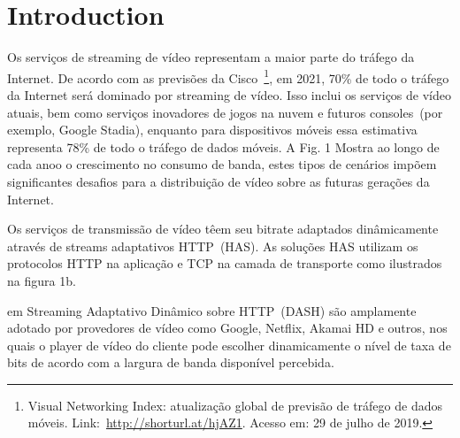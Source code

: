 \section{Introduction}
\label{ch:introduction}



Os serviços de streaming de vídeo representam a maior parte do tráfego da Internet. De acordo com as previsões da Cisco~\footnote{Visual Networking Index: atualização global de previsão de tráfego de dados móveis. Link:~\url{http://shorturl.at/hjAZ1}. Acesso em: 29 de julho de 2019.}, em 2021, 70\% de todo o tráfego da Internet será dominado por streaming de vídeo. Isso inclui os serviços de vídeo atuais, bem como serviços inovadores de jogos na nuvem e futuros consoles~(por exemplo, Google Stadia), enquanto para dispositivos móveis essa estimativa representa 78\% de todo o tráfego de dados móveis. A Fig. 1 Mostra ao longo de cada anoo o crescimento no consumo de banda, estes tipos de cenários impõem significantes desafios para a distribuição de vídeo sobre as futuras gerações da Internet.


Os serviços de transmissão de vídeo têem seu bitrate adaptados dinâmicamente através de streams adaptativos HTTP~(HAS). As soluções HAS utilizam os protocolos HTTP na aplicação e TCP na camada de transporte como ilustrados na figura 1b. 

em Streaming Adaptativo Dinâmico sobre HTTP~(DASH) são amplamente adotado por provedores de vídeo como Google, Netflix, Akamai HD e outros, nos quais o player de vídeo do cliente pode escolher dinamicamente o nível de taxa de bits de acordo com a largura de banda disponível percebida.

